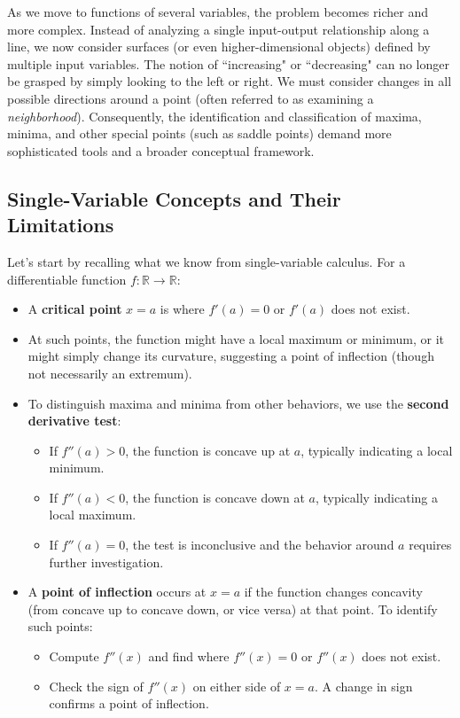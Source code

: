 \noindent As we move to functions of several variables, the problem becomes richer and more complex. Instead of analyzing a single input-output relationship along a line, we now consider surfaces (or even higher-dimensional objects) defined by multiple input variables. The notion of ``increasing" or ``decreasing" can no longer be grasped by simply looking to the left or right. We must consider changes in all possible directions around a point (often referred to as examining a \textit{neighborhood}). Consequently, the identification and classification of maxima, minima, and other special points (such as saddle points) demand more sophisticated tools and a broader conceptual framework. 

\subsection*{Single-Variable Concepts and Their Limitations} 

\noindent Let’s start by recalling what we know from single-variable calculus. For a differentiable function \( f: \mathbb{R} \to \mathbb{R} \):
\begin{itemize}
    \item A \textbf{critical point} \( x = a \) is where \( f'(a) = 0 \) or \( f'(a) \) does not exist.
    \item At such points, the function might have a local maximum or minimum, or it might simply change its curvature, suggesting a point of inflection (though not necessarily an extremum).
    \item To distinguish maxima and minima from other behaviors, we use the \textbf{second derivative test}:
    \begin{itemize}
        \item[$\circ$] If \( f''(a) > 0 \), the function is concave up at \( a \), typically indicating a local minimum.
        \item[$\circ$] If \( f''(a) < 0 \), the function is concave down at \( a \), typically indicating a local maximum.
        \item[$\circ$] If \( f''(a) = 0 \), the test is inconclusive and the behavior around \( a \) requires further investigation.
    \end{itemize}
    \item A \textbf{point of inflection} occurs at \( x = a \) if the function changes concavity (from concave up to concave down, or vice versa) at that point. To identify such points:
    \begin{itemize}
        \item[$\circ$] Compute \( f''(x) \) and find where \( f''(x) = 0 \) or \( f''(x) \) does not exist.
        \item[$\circ$] Check the sign of \( f''(x) \) on either side of \( x = a \). A change in sign confirms a point of inflection.
    \end{itemize}
\end{itemize}


